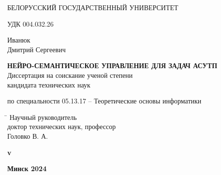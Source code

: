 \begin{titlepage}

    \begin{center} \bfseries
        \bigskip
        \medskip

        {БЕЛОРУССКИЙ ГОСУДАРСТВЕННЫЙ УНИВЕРСИТЕТ}
    \end{center}
    \vspace{1cm}

    \noindent УДК 004.032.26 \\
    \vspace{1cm}

    \begin{center}
        {Иванюк \\ Дмитрий Сергеевич}\\
        \vspace{1cm}

        {\bfseries НЕЙРО-СЕМАНТИЧЕСКОЕ УПРАВЛЕНИЕ ДЛЯ ЗАДАЧ АСУТП}\\
        \vspace{2cm}
        Диссертация на соискание ученой степени\\
        кандидата технических наук\\
        \bigskip

        по специальности 05.13.17 -- Теоретические основы информатики
    \end{center}
    \vspace{3cm}

    \begin{tabbing}
        \hspace{8cm} \= \kill \>
        Научный руководитель \+ \\
        доктор технических наук, профессор\\
        Головко В. А.
    \end{tabbing}


    \ifdefined\dissertationversion
        \vspace{3cm}
        \begin{center}
            \bfseries v\dissertationversion
        \end{center}
        \vspace{3cm}
    \else
        \vspace{7cm}
    \fi

    \begin{center}
        \bfseries Минск 2024
    \end{center}

\end{titlepage}
